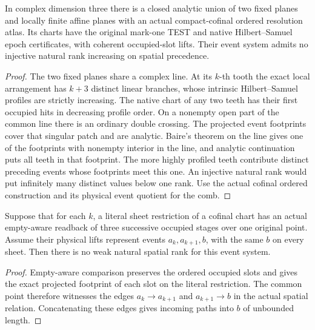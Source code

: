 \begin{theorem}
\leanok
In complex dimension three there is a closed analytic union of
two fixed planes and locally finite affine planes with an actual
compact-cofinal ordered resolution atlas. Its charts have the
original mark-one TEST and native Hilbert--Samuel epoch certificates,
with coherent occupied-slot lifts. Their event system admits no
injective natural rank increasing on spatial precedence.
\end{theorem}
\begin{proof}
The two fixed planes share a complex line. At its \(k\)-th tooth
the exact local arrangement has \(k+3\) distinct linear branches,
whose intrinsic Hilbert--Samuel profiles are strictly increasing.
The native chart of any two teeth has their first occupied hits
in decreasing profile order. On a nonempty open part of the
common line there is an ordinary double crossing. The projected
event footprints cover that singular patch and are analytic.
Baire's theorem on the line gives one of the footprints with
nonempty interior in the line, and analytic continuation puts
all teeth in that footprint. The more highly profiled teeth
contribute distinct preceding events whose footprints meet this
one. An injective natural rank would put infinitely many distinct
values below one rank. Use the actual cofinal ordered construction
and its physical event quotient for the comb.
\end{proof}

\begin{proposition}
\label{hir:g8-three-stage-sheet-height}
\leanok
Suppose that for each \(k\), a literal sheet restriction of a
cofinal chart has an actual empty-aware readback of three
successive occupied stages over one original point. Assume
their physical lifts represent events \(a_k,a_{k+1},b\),
with the same \(b\) on every sheet. Then there is no weak
natural spatial rank for this event system.
\end{proposition}
\begin{proof}
Empty-aware comparison preserves the ordered occupied slots
and gives the exact projected footprint of each slot on the
literal restriction. The common point therefore witnesses
the edges \(a_k\to a_{k+1}\) and \(a_{k+1}\to b\)
in the actual spatial relation. Concatenating these edges
gives incoming paths into \(b\) of unbounded length.
\end{proof}

